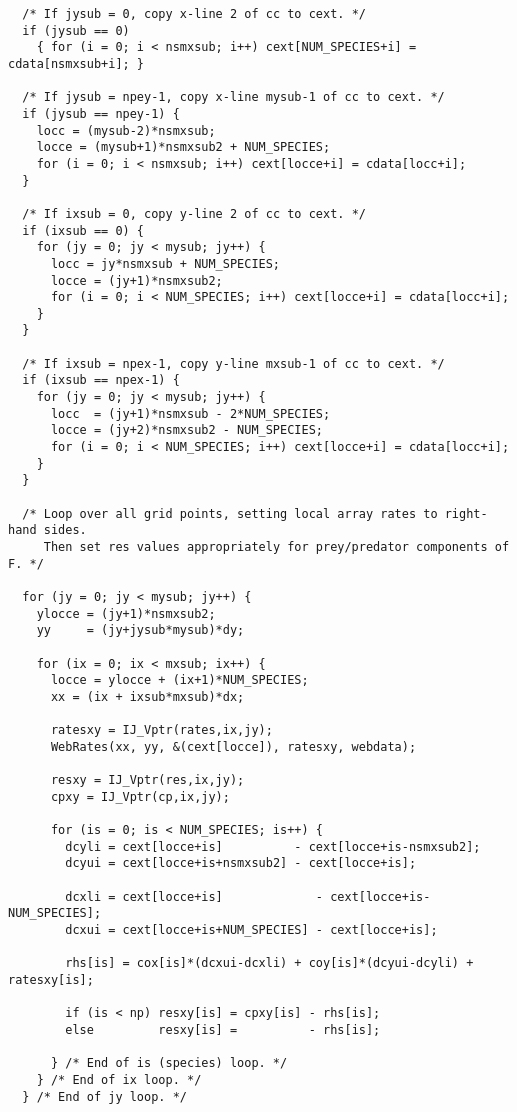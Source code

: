 \documentclass[11pt]{article}
\begin{document}
\begin{verbatim}
  /* If jysub = 0, copy x-line 2 of cc to cext. */
  if (jysub == 0)
    { for (i = 0; i < nsmxsub; i++) cext[NUM_SPECIES+i] = cdata[nsmxsub+i]; }

  /* If jysub = npey-1, copy x-line mysub-1 of cc to cext. */
  if (jysub == npey-1) {
    locc = (mysub-2)*nsmxsub;
    locce = (mysub+1)*nsmxsub2 + NUM_SPECIES;
    for (i = 0; i < nsmxsub; i++) cext[locce+i] = cdata[locc+i];
  }

  /* If ixsub = 0, copy y-line 2 of cc to cext. */
  if (ixsub == 0) {
    for (jy = 0; jy < mysub; jy++) {
      locc = jy*nsmxsub + NUM_SPECIES;
      locce = (jy+1)*nsmxsub2;
      for (i = 0; i < NUM_SPECIES; i++) cext[locce+i] = cdata[locc+i];
    }
  }

  /* If ixsub = npex-1, copy y-line mxsub-1 of cc to cext. */
  if (ixsub == npex-1) {
    for (jy = 0; jy < mysub; jy++) {
      locc  = (jy+1)*nsmxsub - 2*NUM_SPECIES;
      locce = (jy+2)*nsmxsub2 - NUM_SPECIES;
      for (i = 0; i < NUM_SPECIES; i++) cext[locce+i] = cdata[locc+i];
    }
  }

  /* Loop over all grid points, setting local array rates to right-hand sides.
     Then set res values appropriately for prey/predator components of F. */

  for (jy = 0; jy < mysub; jy++) {
    ylocce = (jy+1)*nsmxsub2;
    yy     = (jy+jysub*mysub)*dy;

    for (ix = 0; ix < mxsub; ix++) {
      locce = ylocce + (ix+1)*NUM_SPECIES;
      xx = (ix + ixsub*mxsub)*dx;

      ratesxy = IJ_Vptr(rates,ix,jy);
      WebRates(xx, yy, &(cext[locce]), ratesxy, webdata);

      resxy = IJ_Vptr(res,ix,jy); 
      cpxy = IJ_Vptr(cp,ix,jy); 

      for (is = 0; is < NUM_SPECIES; is++) {
        dcyli = cext[locce+is]          - cext[locce+is-nsmxsub2];
        dcyui = cext[locce+is+nsmxsub2] - cext[locce+is];

        dcxli = cext[locce+is]             - cext[locce+is-NUM_SPECIES];
        dcxui = cext[locce+is+NUM_SPECIES] - cext[locce+is];

        rhs[is] = cox[is]*(dcxui-dcxli) + coy[is]*(dcyui-dcyli) + ratesxy[is];

        if (is < np) resxy[is] = cpxy[is] - rhs[is];
        else         resxy[is] =          - rhs[is];

      } /* End of is (species) loop. */
    } /* End of ix loop. */
  } /* End of jy loop. */


\end{verbatim}
\end{document}
